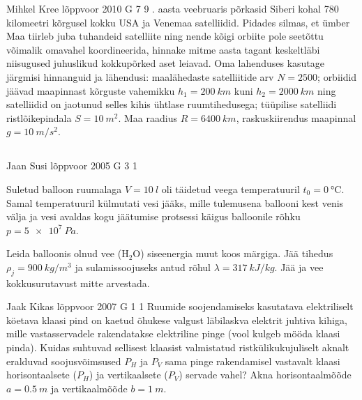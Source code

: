 \documentclass[11pt]{article}
\begin{document}
{%
{Mihkel Kree} %
{lõppvoor} %
{2010} %
{G 7} %
{9} %
{
. aasta veebruaris põrkasid Siberi kohal 780 kilomeetri kõrgusel kokku USA ja Venemaa satelliidid. Pidades silmas, et ümber Maa tiirleb juba tuhandeid satelliite ning nende kõigi orbiite pole seetõttu võimalik omavahel koordineerida, hinnake mitme aasta tagant keskeltläbi niisugused juhuslikud kokkupõrked aset leiavad. Oma lahenduses kasutage järgmisi hinnanguid ja lähendusi: maalähedaste satelliitide arv $N=\num{2500}$; orbiidid jäävad maapinnast kõrguste vahemikku $h_1=\SI{200}{km}$ kuni $h_2=\SI{2000}{km}$ ning satelliidid on jaotunud selles kihis ühtlase ruumtihedusega; tüüpilise satelliidi ristlõikepindala $S=\SI{10}{m^2}$. Maa raadius $R=\SI{6400}{km}$, raskuskiirendus maapinnal $g=\SI{10}{m/s^2}$.
\fi
}
\newpage\subsection{\protect{}}

{Jaan Susi} %
{lõppvoor} %
{2005} %
{G 3} %
{1} %
{
\ifStatement
Suletud balloon ruumalaga $V = \SI{10}{l}$ oli täidetud veega temperatuuril $t_0 = \SI{0}{\celsius}$. Samal temperatuuril külmutati vesi jääks, mille tulemusena ballooni kest venis välja ja vesi avaldas kogu jäätumise protsessi käigus balloonile rõhku $p = \SI{5e7}{Pa}$.

Leida balloonis olnud vee ($\mathrm{H_2O}$) siseenergia muut koos märgiga. Jää tihedus $\rho_j = \SI{900}{kg/m^3}$ ja sulamissoojuseks antud rõhul $\lambda = \SI{317}{kJ/kg}$. Jää ja vee kokkusurutavust mitte arvestada. 
\fi
}

{Jaak Kikas} %
{lõppvoor} %
{2007} %
{G 1} %
{1} %
{
\ifStatement
Ruumide soojendamiseks kasutatava elektriliselt köetava klaasi pind on kaetud õhukese valgust läbilaskva elektrit juhtiva kihiga, mille vastasservadele rakendatakse elektriline pinge (vool kulgeb mööda klaasi pinda). Kuidas suhtuvad sellisest klaasist valmistatud ristkülikukujuliselt aknalt eralduvad soojusvõimsused $P_H$ ja $P_V$ sama pinge rakendamisel vastavalt klaasi horisontaalsete ($P_H$) ja vertikaalsete ($P_V$) servade vahel? Akna horisontaalmõõde $a = \SI{0,5}{m}$ ja vertikaalmõõde $b = \SI{1}{m}$.
\fi
}

}
\end{document}
